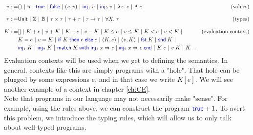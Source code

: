 \documentclass[twoside,11pt,openright]{report}
\theoremstyle{definition}
\newcommand{\BNFdef}{::=}
\newcommand{\ALT}{~|~}
\newcommand{\Keyword}[1]{{\color{blue} \mathsf{#1}}}
\newcommand{\var}{x}
\newcommand{\expr}{e}
\newcommand{\val}{v}
\newcommand{\TT}{()}
\newcommand{\Num}[1]{\overline{#1}}
\newcommand{\True}{\Keyword{true}}
\newcommand{\False}{\Keyword{false}}
\newcommand{\IfCmd}{\Keyword{if}}
\newcommand{\ThenCmd}{\Keyword{then}}
\newcommand{\ElseCmd}{\Keyword{else}}
\def\If#1then#2else#3{\IfCmd{}\;#1\;\ThenCmd{}\;#2\;\ElseCmd{}\;#3}
\newcommand{\Fst}{\Keyword{fst}\;}
\newcommand{\Snd}{\Keyword{snd}\;}
\newcommand{\Inj}[1]{\Keyword{inj}_{#1}\;}
\newcommand{\MatchCmd}{\Keyword{match}}
\newcommand{\WithCmd}{\Keyword{with}}
\newcommand{\EndCmd}{\Keyword{end}}
\def\Match#1with#2=>#3|#4=>#5end{\MatchCmd{}\;#1\;\WithCmd{}\;#2\Rightarrow#3 \;|\;#4\Rightarrow#5\;\EndCmd{}}
\newcommand{\Tvar}{X}
\newcommand{\Tlam}{\Lambda\;}
\newcommand{\Tapp}[1]{#1\;\_}
\newcommand{\empelctx}{[]}
\newcommand{\elctx}{K}
\newcommand{\Tunit}{\mathsf{Unit}}
\newcommand{\Tint}{\mathbb{Z}}
\newcommand{\Tbool}{\mathbb{B}}
\newcommand{\Tprod}[2]{#1 \times #2}
\newcommand{\Tsum}[2]{#1 + #2}
\newcommand{\Tfunc}[2]{#1 \rightarrow #2}
\newcommand{\Tall}[2]{\forall #1.\; #2}
\newcommand{\typ}{\tau}
\begin{document}
\begin{align*}
  \val \BNFdef  & \TT \ALT \Num{n} \ALT \True \ALT \False \ALT
                  (\val, \val) \ALT \Inj{1} \val \ALT \Inj{2} \val \ALT
                  \fun \var . \expr \ALT \Tlam \expr
                  & \text{(values)}\\[8pt]
  \typ \BNFdef  & \Tunit \ALT \Tint \ALT \Tbool \ALT {\Tprod \typ \typ} \ALT
                  {\Tsum \typ \typ} \ALT {\Tfunc \typ \typ} \ALT 
                  {\Tall \Tvar \typ} & \text{(types)}\\[8pt]
  \elctx \BNFdef& \empelctx \ALT 
                  \elctx + \expr \ALT \val + \elctx \ALT
                  \elctx - \expr \ALT \val - \elctx \ALT
                  \elctx \le \expr \ALT \val \le \elctx \ALT
                  \elctx < \expr \ALT \val < \elctx \ALT 
                  & \text{(evaluation context)}\\
                & \elctx = \expr \ALT \val = \elctx \ALT
                  {\If \elctx then \expr else \expr} \ALT
                  (\elctx, \expr) \ALT (\val, \elctx) \ALT
                  \Fst \elctx \ALT \Snd \elctx \ALT\\
                & \Inj{1} \elctx \ALT \Inj{2} \elctx \ALT
                  \Match \elctx with \Inj{1} \var => \expr | \Inj{2} \var => \expr end \ALT
                  \elctx \; \expr \ALT \val \; \elctx \ALT \Tapp{\elctx}
\end{align*}
Evaluation contexts will be used when we get to defining the semantics. In general, contexts like this are simply programs with a "hole". That hole can be plugged by some expressions $\expr$, and in that case we write $\elctx[\expr]$. We will see another example of a context in chapter \ref{ch:CE}.\\
Note that programs in our language may not necessarily make "sense". For example, using the rules above, we can construct the program $\True + 1$. To avert this problem, we introduce the typing rules, which will allow us to only talk about well-typed programs.
\end{document}
